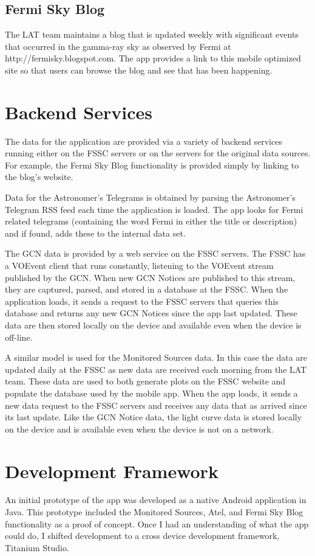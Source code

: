 \documentclass[11pt,twoside]{article}
\begin{document}
\subsection{Fermi Sky Blog}
The LAT team maintains a blog that is updated weekly with significant events that occurred in the gamma-ray sky as observed by Fermi at http://fermisky.blogspot.com.  The app provides a link to this mobile optimized site so that users can browse the blog and see that has been happening.

\section{Backend Services}
The data for the application are provided via a variety of backend services running either on the FSSC servers or on the servers for the original data sources.  For example, the Fermi Sky Blog functionality is provided simply by linking to the blog's website.

Data for the Astronomer's Telegrams is obtained by parsing the Astronomer's Telegram RSS feed each time the application is loaded.  The app looks for Fermi related telegrams (containing the word Fermi in either the title or description) and if found, adds these to the internal data set.

The GCN data is provided by a web service on the FSSC servers.  The FSSC has a VOEvent client that runs constantly, listening to the VOEvent stream published by the GCN.  When new GCN Notices are published to this stream, they are captured, parsed, and stored in a database at the FSSC.  When the application loads, it sends a request to the FSSC servers that queries this database and returns any new GCN Notices since the app last updated.  These data are then stored locally on the device and available even when the device is off-line.

A similar model is used for the Monitored Sources data.  In this case the data are updated daily at the FSSC as new data are received each morning from the LAT team.  These data are used to both generate plots on the FSSC website and populate the database used by the mobile app.  When the app loads, it sends a new data request to the FSSC servers and receives any data that as arrived since its last update.  Like the GCN Notice data, the light curve data is stored locally on the device and is available even when the device is not on a network.

\section{Development Framework}
An initial prototype of the app was developed as a native Android application in Java.  This prototype included the Monitored Sources, Atel, and Fermi Sky Blog functionality as a proof of concept.  Once I had an understanding of what the app could do, I shifted development to a cross device development framework, Titanium Studio.  
\end{document}

